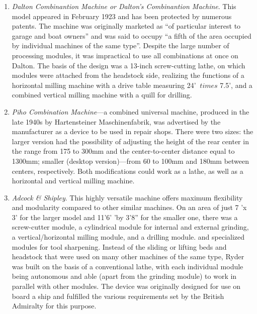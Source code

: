 \begin{enumerate}
	\item\textit{Dalton Combinantion Machine or Dalton's Combinantion Machine}. This model appeared in February 1923 and has been protected by numerous patents. The machine was originally marketed as ``of particular interest to garage and boat owners'' and was said to occupy ``a fifth of the area occupied by individual machines of the same type''. Despite the large number of processing modules, it was impractical to use all combinations at once on Dalton. The basis of the design was a 13-inch screw-cutting lathe, on which modules were attached from the headstock side, realizing the functions of a horizontal milling machine with a drive table measuring 24' $ \ times $ 7.5', and a combined vertical milling machine with a quill for drilling.
	\item\textit{Piho Combination Machine}---a combined universal machine, produced in the late 1940s by Hartensteiner Maschinenfabrik, was advertised by the manufacturer as a device to be used in repair shops. There were two sizes: the larger version had the possibility of adjusting the height of the rear center in the range from 175 to 300\:mm and the center-to-center distance equal to 1300\:mm; smaller (desktop version)---from 60 to 100\:mm and 180\:mm between centers, respectively. Both modifications could work as a lathe, as well as a horizontal and vertical milling machine.
	\item\textit {Adcock \& Shipley}. This highly versatile machine offers maximum flexibility and modularity compared to other similar machines. On an area of just 7 'x 3' for the larger model and 11'6' 'by 3'8'' for the smaller one, there was a screw-cutter module, a cylindrical module for internal and external grinding, a vertical/horizontal milling module, and a drilling module. and specialized modules for tool sharpening. Instead of the sliding or lifting beds and headstock that were used on many other machines of the same type, Ryder was built on the basis of a conventional lathe, with each individual module being autonomous and able (apart from the grinding module) to work in parallel with other modules. The device was originally designed for use on board a ship and fulfilled the various requirements set by the British Admiralty for this purpose.
\end{enumerate}


